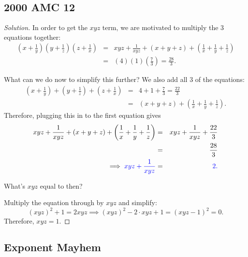\subsection{2000 AMC 12}
\begin{proof}[Solution]
In order to get the $xyz$ term, we are motivated to multiply the $3$ equations together: \begin{eqnarray*} \left(x+\frac{1}{y}\right)\left(y+\frac{1}{z}\right)\left(z+\frac{1}{x}\right)&=&xyz+\frac{1}{xyz}+\left(x+y+z\right)+\left(\frac{1}{x}+\frac{1}{y}+\frac{1}{z}\right) \\ &=& \left(4\right)\left(1\right)\left(\frac73\right)=\frac{28}{3}. \end{eqnarray*}  

What can we do now to simplify this further?
\clearpage
We also add all $3$ of the equations: \begin{eqnarray*} \left(x+\frac{1}{y}\right)+\left(y+\frac{1}{z}\right)+\left(z+\frac{1}{x}\right)&=&4+1+\frac{7}{3}=\frac{22}{3} \\ &=& \left(x+y+z\right)+\left(\frac{1}{x}+\frac{1}{y}+\frac{1}{z}\right). \end{eqnarray*}  
Therefore, plugging this in to the first equation gives \begin{eqnarray*} xyz+\frac{1}{xyz}+\left(x+y+z\right)+\left(\frac{1}{x}+\frac{1}{y}+\frac{1}{z}\right) &=& xyz+\frac{1}{xyz}+\frac{22}{3} \\ &=&\frac{28}{3} \\ \implies \color{blue} xyz+\frac{1}{xyz} &=& \color{blue} 2. \end{eqnarray*}  

What's $xyz$ equal to then?

\clearpage

Multiply the equation through by $xyz$ and simplify: $$(xyz)^2+1=2xyz\implies (xyz)^2-2\cdot xyz+1=(xyz-1)^2=0.$$  
Therefore, $xyz=\boxed{1}$.  \end{proof}

\subsection{Exponent Mayhem} 

